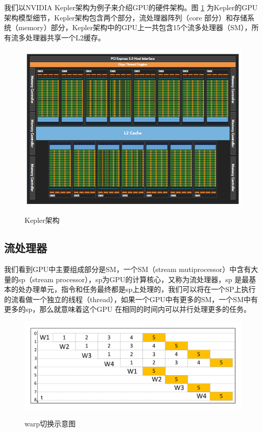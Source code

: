 我们以NVIDIA Kepler架构为例子来介绍GPU的硬件架构。图 \ref{KPA} 为Kepler的GPU架构模型细节，Kepler架构包含两个部分，流处理器阵列（core 部分）和存储系统（memory）部分，Kepler架构中的GPU上一共包含15个流多处理器（SM），所有流多处理器共享一个L2缓存。
\begin{figure}
\setlength{\belowcaptionskip}{-0.5cm}
  \begin{center}
    {\includegraphics[width=1 \textwidth]{figures/arc.png}}
    \end{center}
  \caption{{\footnotesize{Kepler架构}}}
  \label{KPA}
\end{figure}
\subsection {流处理器}
我们看到GPU中主要组成部分是SM，一个SM（stream mutiprocessor）中含有大量的sp（stream processor），sp为GPU的计算核心，又称为流处理器，sp 是最基本的处办理单元，指令和任务最终都是sp上处理的，我们可以将在一个SP上执行的流看做一个独立的线程（thread），如果一个GPU中有更多的SM，一个SM中有更多的sp，那么就意味着这个GPU 在相同的时间内可以并行处理更多的任务。
\begin{figure}
\setlength{\belowcaptionskip}{-0.5cm}
  \begin{center}
    {\includegraphics[width=1 \textwidth]{figures/warpsketch.pdf}}
    \end{center}
  \caption{{\footnotesize{warp切换示意图}}}
  \label{wps}
\end{figure}
